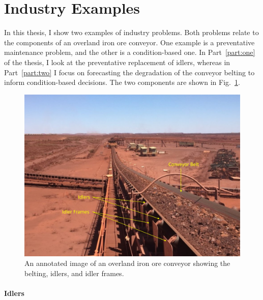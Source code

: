 \section{Industry Examples}
\label{sec:industry-data}

In this thesis, I show two examples of industry problems. Both problems relate to the components of an overland iron ore conveyor. One example is a preventative maintenance problem, and the other is a condition-based one. In Part~\ref{part:one} of the thesis, I look at the preventative replacement of idlers, whereas in Part~\ref{part:two} I focus on forecasting the degradation of the conveyor belting to inform condition-based decisions. The two components are shown in Fig.~\ref{fig:belt_and_frame}.

\begin{figure}
  \centering
  \includegraphics[width=1\textwidth]{./figures/cvr_example_edit_annotation.jpg}
  \caption{An annotated image of an overland iron ore conveyor \citep{australianmining2020} showing the belting, idlers, and idler frames.}
  \label{fig:belt_and_frame}
\end{figure}

\paragraph*{Idlers}


